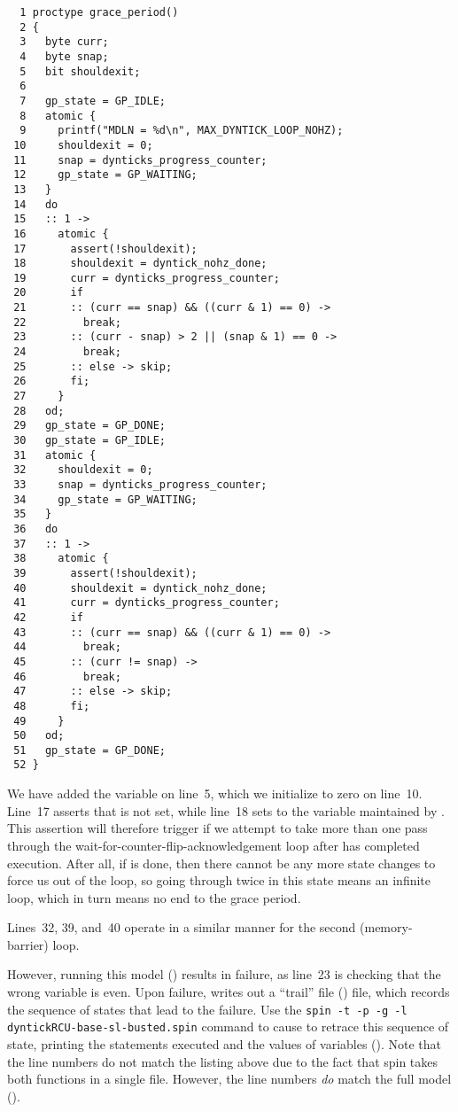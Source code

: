 { \scriptsize
\begin{verbatim}
  1 proctype grace_period()
  2 {
  3   byte curr;
  4   byte snap;
  5   bit shouldexit;
  6
  7   gp_state = GP_IDLE;
  8   atomic {
  9     printf("MDLN = %d\n", MAX_DYNTICK_LOOP_NOHZ);
 10     shouldexit = 0;
 11     snap = dynticks_progress_counter;
 12     gp_state = GP_WAITING;
 13   }
 14   do
 15   :: 1 ->
 16     atomic {
 17       assert(!shouldexit);
 18       shouldexit = dyntick_nohz_done;
 19       curr = dynticks_progress_counter;
 20       if
 21       :: (curr == snap) && ((curr & 1) == 0) ->
 22         break;
 23       :: (curr - snap) > 2 || (snap & 1) == 0 ->
 24         break;
 25       :: else -> skip;
 26       fi;
 27     }
 28   od;
 29   gp_state = GP_DONE;
 30   gp_state = GP_IDLE;
 31   atomic {
 32     shouldexit = 0;
 33     snap = dynticks_progress_counter;
 34     gp_state = GP_WAITING;
 35   }
 36   do
 37   :: 1 ->
 38     atomic {
 39       assert(!shouldexit);
 40       shouldexit = dyntick_nohz_done;
 41       curr = dynticks_progress_counter;
 42       if
 43       :: (curr == snap) && ((curr & 1) == 0) ->
 44         break;
 45       :: (curr != snap) ->
 46         break;
 47       :: else -> skip;
 48       fi;
 49     }
 50   od;
 51   gp_state = GP_DONE;
 52 }
\end{verbatim}
}

We have added the  variable on line~5,
which we initialize to zero on line~10.
Line~17 asserts that  is not set, while
line~18 sets  to the 
variable maintained by .
This assertion will therefore trigger if we attempt to take more than
one pass through the wait-for-counter-flip-acknowledgement
loop after  has completed
execution.
After all, if  is done, then there cannot be
any more state changes to force us out of the loop, so going through twice
in this state means an infinite loop, which in turn means no end to the
grace period.

Lines~32, 39, and~40 operate in a similar manner for the
second (memory-barrier) loop.

However, running this
model ()
results in failure, as line~23 is checking that the wrong variable
is even.
Upon failure,  writes out a
``trail'' file
()
file, which records the sequence of states that lead to the failure.
Use the {\tt spin -t -p -g -l dyntickRCU-base-sl-busted.spin}
command to cause  to retrace this sequence of state,
printing the statements executed and the values of variables
().
Note that the line numbers do not match the listing above due to
the fact that spin takes both functions in a single file.
However, the line numbers \emph{do} match the full
model ().

